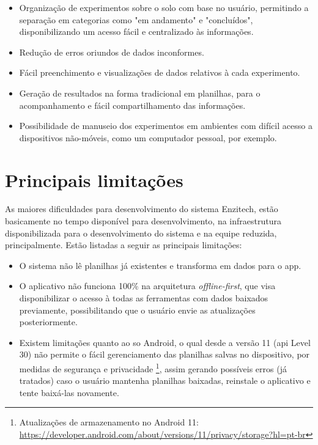 \begin{itemize}
    \item Organização de experimentos sobre o solo com base no usuário, permitindo a separação em categorias como "em andamento" e "concluídos", disponibilizando um acesso fácil e centralizado às informações.
    \item Redução de erros oriundos de dados inconformes.
    \item Fácil preenchimento e visualizações de dados relativos à cada experimento.
    \item Geração de resultados na forma tradicional em planilhas, para o acompanhamento e fácil compartilhamento das informações.
    \item Possibilidade de manuseio dos experimentos em ambientes com difícil acesso a dispositivos não-móveis, como um computador pessoal, por exemplo.
    
\end{itemize}

\section{Principais limitações}\label{sec:limitacoes}
As maiores dificuldades para desenvolvimento do sistema Enzitech, estão basicamente no tempo disponível para desenvolvimento, na infraestrutura disponibilizada para o desenvolvimento do sistema e na equipe reduzida, principalmente. Estão listadas a seguir as principais limitações:\begin{itemize}
    \item O sistema não lê planilhas já existentes e transforma em dados para o \ac{app}.
    \item O aplicativo não funciona 100\% na arquitetura \textit{offline-first}, que visa disponibilizar o acesso à todas as ferramentas com dados baixados previamente, possibilitando que o usuário envie as atualizações posteriormente.
    \item Existem limitações quanto ao \ac{so} Android, o qual desde a versão 11 (\ac{api} Level 30) não permite o fácil gerenciamento das planilhas salvas no dispositivo, por medidas de segurança e privacidade \footnote{\label{android_11}Atualizações de armazenamento no Android 11: \url{https://developer.android.com/about/versions/11/privacy/storage?hl=pt-br}}, assim gerando possíveis erros (já tratados) caso o usuário mantenha planilhas baixadas, reinstale o aplicativo e tente baixá-las novamente.
\end{itemize}

